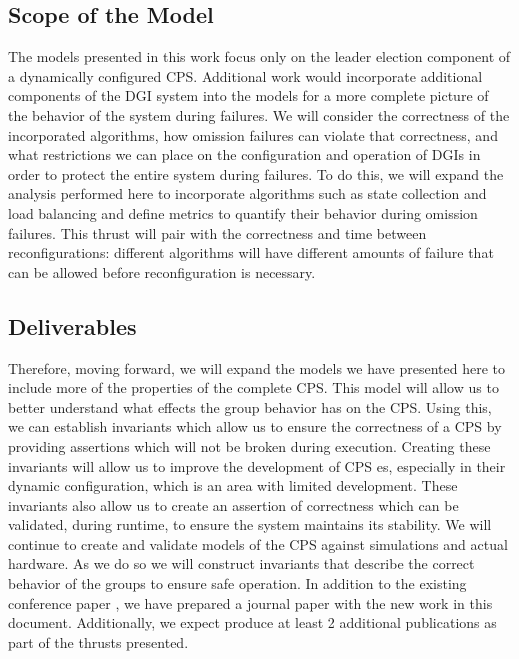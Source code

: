 \subsection{Scope of the Model}

The models presented in this work focus only on the leader election component of a dynamically configured CPS. Additional work would incorporate additional components of the DGI system into the models for a more complete picture of the behavior of the system during failures. We will consider the correctness of the incorporated algorithms, how omission failures can violate that correctness, and what restrictions we can place on the configuration and operation of DGIs in order to protect the entire system during failures. To do this, we will expand the analysis performed here to incorporate algorithms such as state collection and load balancing and define metrics to quantify their behavior during omission failures. This thrust will pair with the correctness and time between reconfigurations: different algorithms will have different amounts of failure that can be allowed before reconfiguration is necessary.

\subsection{Deliverables}

Therefore, moving forward, we will expand the models we have presented here to include more of the properties of the complete CPS. This model will allow us to better understand what effects the group behavior has on the CPS. Using this, we can establish invariants which allow us to ensure the correctness of a CPS by providing assertions which will not be broken during execution. Creating these invariants will allow us to improve the development of CPS es, especially in their dynamic configuration, which is an area with limited development. These invariants also allow us to create an assertion of correctness which can be validated, during runtime, to ensure the system maintains its stability. We will continue to create and validate models of the CPS against simulations and actual hardware. As we do so we will construct invariants that describe the correct behavior of the groups to ensure safe operation. In addition to the existing conference paper \cite{CRITIS2012}, we have prepared a journal paper with the new work in this document. Additionally, we expect produce at least 2 additional publications as part of the thrusts presented. 
